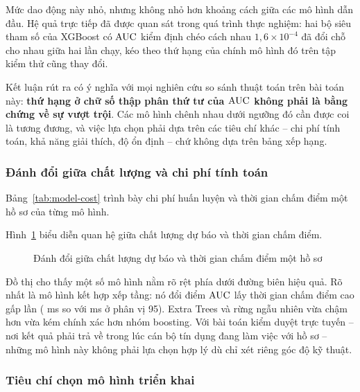 Mức dao động này nhỏ, nhưng không nhỏ hơn khoảng cách giữa các mô hình dẫn đầu.
Hệ quả trực tiếp đã được quan sát trong quá trình thực nghiệm: hai bộ siêu tham
số của XGBoost có $\mathrm{AUC}$ kiểm định chéo cách nhau $1{,}6 \times 10^{-4}$ đã đổi
chỗ cho nhau giữa hai lần chạy, kéo theo thứ hạng của chính mô hình đó trên tập
kiểm thử cũng thay đổi.

Kết luận rút ra có ý nghĩa với mọi nghiên cứu so sánh thuật toán trên bài toán
này: \textbf{thứ hạng ở chữ số thập phân thứ tư của $\mathrm{AUC}$ không phải là bằng
chứng về sự vượt trội}. Các mô hình chênh nhau dưới ngưỡng đó cần được coi là
tương đương, và việc lựa chọn phải dựa trên các tiêu chí khác -- chi phí tính
toán, khả năng giải thích, độ ổn định -- chứ không dựa trên bảng xếp hạng.

\subsubsection{Đánh đổi giữa chất lượng và chi phí tính toán}

Bảng~\ref{tab:model-cost} trình bày chi phí huấn luyện và thời gian chấm điểm một
hồ sơ của từng mô hình.



Hình~\ref{fig:auc-vs-latency} biểu diễn quan hệ giữa chất lượng dự báo và thời
gian chấm điểm.

\begin{figure}[!htbp]
\centering
{}
\caption{Đánh đổi giữa chất lượng dự báo và thời gian chấm điểm một hồ sơ}
\label{fig:auc-vs-latency}
\end{figure}

Đồ thị cho thấy một số mô hình nằm rõ rệt phía dưới đường biên hiệu quả. Rõ nhất
là mô hình kết hợp xếp tầng: nó đổi \GapTopDeploy{} điểm $\mathrm{AUC}$ lấy thời gian
chấm điểm cao gấp \LatRatioTopDeploy{} lần (\TopAUCLatPFive{} ms so với
\BestLatPFive{} ms ở phân vị 95). Extra Trees và rừng ngẫu nhiên vừa chậm hơn vừa
kém chính xác hơn nhóm boosting. Với bài toán kiểm duyệt trực tuyến -- nơi kết
quả phải trả về trong lúc cán bộ tín dụng đang làm việc với hồ sơ -- những mô
hình này không phải lựa chọn hợp lý dù chỉ xét riêng góc độ kỹ thuật.

\subsubsection{Tiêu chí chọn mô hình triển khai}
\label{subsec:kq-chon-mo-hinh}

